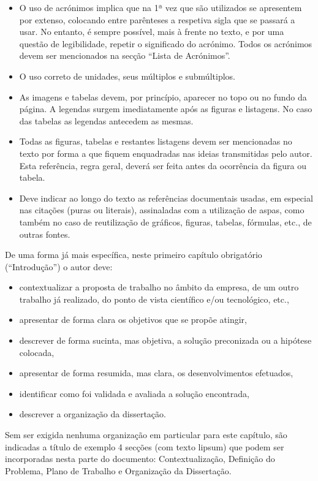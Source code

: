 \begin{itemize}
	\item O uso de acrónimos implica que na 1ª vez que são utilizados se apresentem por extenso, colocando entre parênteses a respetiva sigla que se passará a usar. No entanto, é sempre possível, mais à frente no texto, e por uma questão de legibilidade, repetir o significado do acrónimo. Todos os acrónimos devem ser mencionados na secção ``Lista de Acrónimos''.
	\item O uso correto de unidades, seus múltiplos e submúltiplos.
	\item As imagens e tabelas devem, por princípio, aparecer no topo ou no fundo da página. A legendas surgem imediatamente após as figuras e listagens. No caso das tabelas as legendas antecedem as mesmas.
	\item Todas as figuras, tabelas e restantes listagens devem ser mencionadas no texto por forma a que fiquem enquadradas nas ideias transmitidas pelo autor. Esta referência, regra geral, deverá ser feita antes da ocorrência da figura ou tabela.
	\item Deve indicar ao longo do texto as referências documentais usadas, em especial nas citações (puras ou literais), assinaladas com a utilização de aspas, como também no caso de reutilização de gráficos, figuras, tabelas, fórmulas, etc., de outras fontes.
\end{itemize}

De uma forma já mais específica, neste primeiro capítulo obrigatório (``Introdução'') o autor deve:

\begin{itemize}
	\item contextualizar a proposta de trabalho no âmbito da empresa, de um outro trabalho já realizado, do ponto de vista científico e/ou tecnológico, etc.,
	\item apresentar de forma clara os objetivos que se propõe atingir,
	\item descrever de forma sucinta, mas objetiva, a solução preconizada ou a hipótese colocada,
	\item apresentar de forma resumida, mas clara, os desenvolvimentos efetuados,
	\item identificar como foi validada e avaliada a solução encontrada,
	\item descrever a organização da dissertação.
\end{itemize}

Sem ser exigida nenhuma organização em particular para este capítulo, são indicadas a título de exemplo 4 secções (com texto \gls{lipsum}) que podem ser incorporadas nesta parte do documento: Contextualização, Definição do Problema, Plano de Trabalho e Organização da Dissertação. 	

